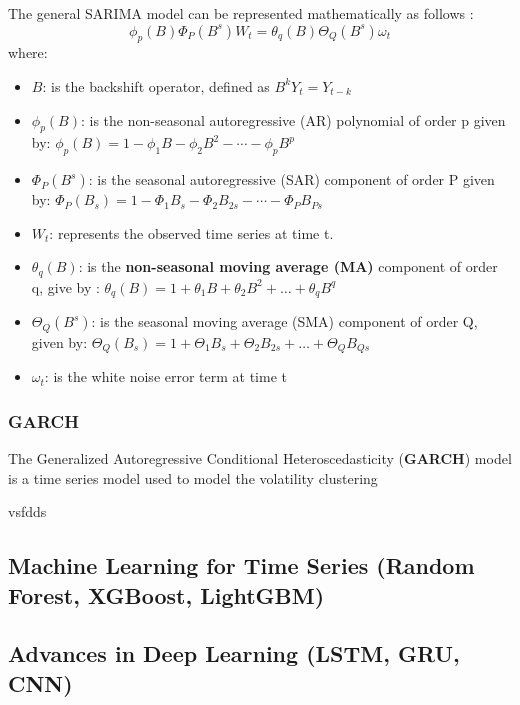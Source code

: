 The general SARIMA model can be represented mathematically as follows \cite{Lee2023}:
\begin{equation}
\phi_p(B)\Phi_P(B^s)W_t = \theta_q(B)\Theta_Q(B^s)\omega_t 
\end{equation} 
where: 
\begin{itemize}
    \item \( B \): is the backshift operator, defined as \( B^k Y_t = Y_{t-k} \) 
    \item \(\phi_p(B)\): is the non-seasonal autoregressive (AR) polynomial of order p given by: \(\phi_p(B) = 1 - \phi_1 B - \phi_2 B^2 - \cdots - \phi_p B^p\)
    \item \(\Phi_P(B^s)\): is the seasonal autoregressive (SAR) component of order P given by: \(\Phi_P(B_s) = 1 - \Phi_1 B_s - \Phi_2 B_{2s} - \cdots - \Phi_P B_{Ps}\) 
    \item \(W_t\): represents the observed time series at time t. 
    \item \(\theta_q(B)\): is the \textbf{non-seasonal moving average (MA)} component of order q, give by : \(\theta_q(B) = 1 + \theta_1 B + \theta_2 B^2 + \ldots + \theta_q B^q\)
    \item \(\Theta_Q(B^s)\): is the seasonal moving average (SMA) component of order Q, given by: \(\Theta_Q(B_s) = 1 + \Theta_1 B_s + \Theta_2 B_{2s} + \ldots + \Theta_Q B_{Qs}\)
    \item \(\omega_t\): is the white noise error term at time t
\end{itemize}

\subsubsection{GARCH}
The Generalized Autoregressive Conditional Heteroscedasticity (\textbf{GARCH}) model is a time series model used to model the volatility clustering

vsfdds








\subsection{Machine Learning for Time Series (Random Forest, XGBoost, LightGBM)} %

\subsection{Advances in Deep Learning (LSTM, GRU, CNN)} %

